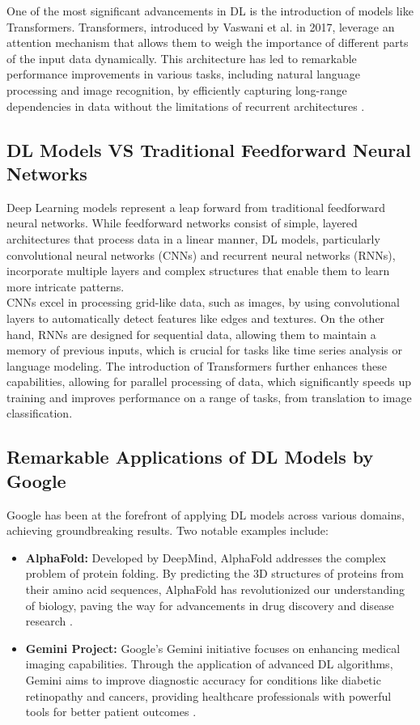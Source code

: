 \documentclass{article}
\begin{document}
One of the most significant advancements in DL is the introduction of models like Transformers. Transformers, introduced by Vaswani et al. in 2017, leverage an attention mechanism that allows them to weigh the importance of different parts of the input data dynamically. This architecture has led to remarkable performance improvements in various tasks, including natural language processing and image recognition, by efficiently capturing long-range dependencies in data without the limitations of recurrent architectures \cite{vaswani2017attention}.

\subsection{DL Models VS Traditional Feedforward Neural Networks}
Deep Learning models represent a leap forward from traditional feedforward neural networks. While feedforward networks consist of simple, layered architectures that process data in a linear manner, DL models, particularly convolutional neural networks (CNNs) and recurrent neural networks (RNNs), incorporate multiple layers and complex structures that enable them to learn more intricate patterns. 
\\

CNNs excel in processing grid-like data, such as images, by using convolutional layers to automatically detect features like edges and textures. On the other hand, RNNs are designed for sequential data, allowing them to maintain a memory of previous inputs, which is crucial for tasks like time series analysis or language modeling. The introduction of Transformers further enhances these capabilities, allowing for parallel processing of data, which significantly speeds up training and improves performance on a range of tasks, from translation to image classification.

\subsection{Remarkable Applications of DL Models by Google}
Google has been at the forefront of applying DL models across various domains, achieving groundbreaking results. Two notable examples include:

\begin{itemize}
	\item \textbf{AlphaFold:} Developed by DeepMind, AlphaFold addresses the complex problem of protein folding. By predicting the 3D structures of proteins from their amino acid sequences, AlphaFold has revolutionized our understanding of biology, paving the way for advancements in drug discovery and disease research \cite{jumper2021highly}.
	
	\item \textbf{Gemini Project:} Google's Gemini initiative focuses on enhancing medical imaging capabilities. Through the application of advanced DL algorithms, Gemini aims to improve diagnostic accuracy for conditions like diabetic retinopathy and cancers, providing healthcare professionals with powerful tools for better patient outcomes \cite{gulshan2016development}.
\end{itemize}
\end{document}
